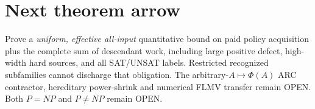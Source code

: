 \documentclass[11pt]{article}
\begin{document}
\section*{Next theorem arrow}
Prove a \emph{uniform, effective all-input} quantitative bound on paid policy acquisition plus the complete sum of descendant work, including large positive defect, high-width hard sources, and all SAT/UNSAT labels. Restricted recognized subfamilies cannot discharge that obligation. The arbitrary-$A\mapsto\Phi(A)$ ARC contractor, hereditary power-shrink and numerical FLMV transfer remain OPEN. Both $P=NP$ and $P\ne NP$ remain OPEN.
\end{document}
